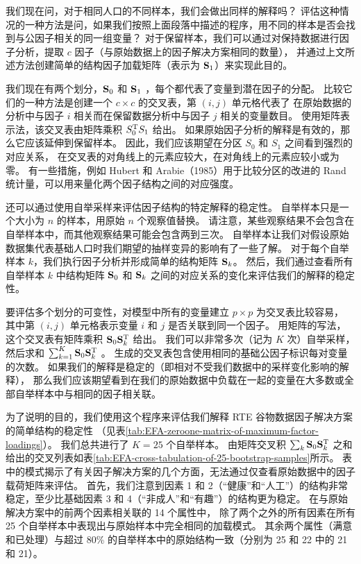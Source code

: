 我们现在问，对于相同人口的不同样本，我们会做出同样的解释吗？
评估这种情况的一种方法是问，如果我们按照上面段落中描述的程序，用不同的样本是否会找到与公因子相关的同一组变量？
对于保留样本，我们可以通过对保持数据进行因子分析，提取 $ c $ 因子（与原始数据上的因子解决方案相同的数量），
并通过上文所述方法创建简单的结构因子加载矩阵（表示为 $ \mathbf{S}_1 $）来实现此目的。

我们现在有两个划分，$ \mathbf{S}_0 $ 和 $ \mathbf{S}_1 $ ，每个都代表了变量到潜在因子的分配。
比较它们的一种方法是创建一个 $ c \times c $ 的交叉表，第 $ (i,j) $ 单元格代表了
在原始数据的分析中与因子 $ i $ 相关而在保留数据分析中与因子 $ j $ 相关的变量数目。
使用矩阵表示法，该交叉表由矩阵乘积 $ S_0^\mathrm{T} S_1 $ 给出。
如果原始因子分析的解释是有效的，那么它应该延伸到保留样本。
因此，我们应该期望在分区 $ S_0 $ 和 $ S_1 $ 之间看到强烈的对应关系，
在交叉表的对角线上的元素应较大，在对角线上的元素应较小或为零。
有一些措施，例如 Hubert 和 Arabie（1985）用于比较分区的改进的 Rand 统计量，可以用来量化两个因子结构之间的对应强度。

还可以通过使用自举采样来评估因子结构的特定解释的稳定性。
自举样本只是一个大小为 $n$ 的样本，用原始 $n$ 个观察值替换。
请注意，某些观察结果不会包含在自举样本中，而其他观察结果可能会包含两到三次。
自举样本让我们对假设原始数据集代表基础人口时我们期望的抽样变异的影响有了一些了解。
对于每个自举样本 $k$，我们执行因子分析并形成简单的结构矩阵 $\mathbf{S}_k$。
然后，我们通过查看所有自举样本 $k$ 中结构矩阵 $\mathbf{S}_0$ 和 $\mathbf{S}_k$ 之间的对应关系的变化来评估我们的解释的稳定性。

要评估多个划分的可变性，对模型中所有的变量建立 $ p \times p $ 为交叉表比较容易，
其中第 $ (i,j) $ 单元格表示变量 $ i $ 和 $ j $ 是否关联到同一个因子。
用矩阵的写法，这个交叉表有矩阵乘积 $ \mathbf{S}_0\mathbf{S}_k^\mathrm{T} $ 给出。
我们可以非常多次（记为 $ K $ 次）自举采样，然后求和 $ \sum_{k=1}^{K}\mathbf{S}_0\mathbf{S}_k^\mathrm{T} $ 。
生成的交叉表包含使用相同的基础公因子标识每对变量的次数。
如果我们的解释是稳定的（即相对不受我们数据中的采样变化影响的解释），
那么我们应该期望看到在我们的原始数据中负载在一起的变量在大多数或全部自举样本中与相同的因子相关联。

为了说明的目的，我们使用这个程序来评估我们解释 RTE 谷物数据因子解决方案的简单结构的稳定性
（见表\ref{tab:EFA-zeroone-matrix-of-maximum-factor-loadings}）。
我们总共进行了 $ K = 25 $ 个自举样本。
由矩阵交叉积 $ \sum_k\mathbf{S}_0\mathbf{S}_k^\mathrm{T} $ 之和给出的交叉列表如表\ref{tab:EFA-cross-tabulation-of-25-bootstrap-samples}所示。
表中的模式揭示了有关因子解决方案的几个方面，无法通过仅查看原始数据中的因子载荷矩阵来评估。
首先，我们注意到因素 1 和 2（“健康”和“人工”）的结构非常稳定，至少比基础因素 3 和 4（“非成人”和“有趣”）的结构更为稳定。
在与原始解决方案中的前两个因素相关联的 14 个属性中，
除了两个之外的所有因素在所有 25 个自举样本中表现出与原始样本中完全相同的加载模式。
其余两个属性（满意和已处理）与超过 80\% 的自举样本中的原始结构一致（分别为 25 和 22 中的 21 和 21）。

